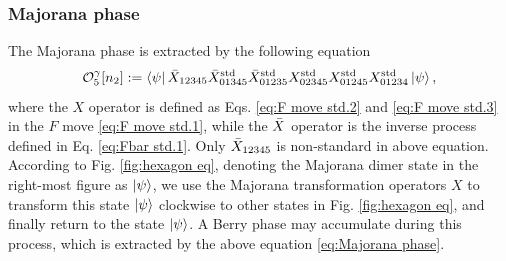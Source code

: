 \documentclass[%
 reprint,
 amsmath,amssymb,
 aps,
prb,
]{revtex4-2}
\begin{document}
\subsubsection{Majorana phase}

The Majorana phase is extracted by the following equation 
\begin{equation}
\mathcal{O}^{\gamma}_5[n_2] := \bra{\psi} \Bar{X}_{12345} \Bar{X}^{\mathrm{std}}_{01345} \Bar{X}^{\mathrm{std}}_{01235} X^{\mathrm{std}}_{02345} X^{\mathrm{std}}_{01245} X^{\mathrm{std}}_{01234} \ket{\psi} ,\label{eq:Majorana phase}
\end{equation}
where the $X$ operator is defined as Eqs. \eqref{eq:F move std.2} and \eqref{eq:F move std.3} in the $F$ move \eqref{eq:F move std.1}, while the $\Bar{X}$ operator is the inverse process defined in Eq. \eqref{eq:Fbar std.1}.
Only $\Bar{X}_{12345}$ is non-standard in above equation.
According to Fig. \ref{fig:hexagon eq}, denoting the Majorana dimer state in the right-most figure as $\ket{\psi}$, we use the Majorana transformation operators $X$ to transform this state $\ket{\psi}$ clockwise to other states in Fig. \ref{fig:hexagon eq}, and finally return to the state $\ket{\psi}$.
A Berry phase may accumulate during this process, which is extracted by the above equation \eqref{eq:Majorana phase}.
\end{document}
